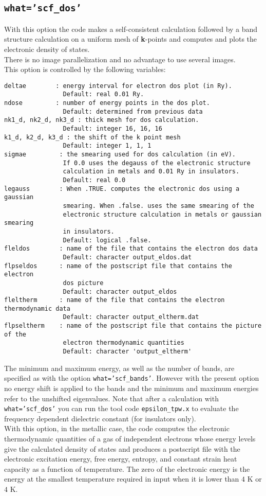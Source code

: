 \documentclass[12pt,a4paper]{article}
\begin{document}
\subsection{\color{web-blue}\texttt{what='scf\_dos'}}
With this option the code makes a self-consistent calculation followed
by a band structure calculation on a uniform mesh of {\bf k}-points and
computes and plots the electronic density of states. \\
There is no image parallelization and no advantage to use several images. \\
This option is controlled by the following variables:
\begin{verbatim} 
deltae        : energy interval for electron dos plot (in Ry).
                Default: real 0.01 Ry.
ndose         : number of energy points in the dos plot.
                Default: determined from previous data
nk1_d, nk2_d, nk3_d : thick mesh for dos calculation.
                Default: integer 16, 16, 16
k1_d, k2_d, k3_d : the shift of the k point mesh
                Default: integer 1, 1, 1
sigmae         : the smearing used for dos calculation (in eV).
                If 0.0 uses the degauss of the electronic structure
                calculation in metals and 0.01 Ry in insulators.
                Default: real 0.0 
legauss        : When .TRUE. computes the electronic dos using a gaussian
                smearing. When .false. uses the same smearing of the
                electronic structure calculation in metals or gaussian smearing
                in insulators.
                Default: logical .false.
fleldos        : name of the file that contains the electron dos data
                Default: character output_eldos.dat
flpseldos      : name of the postscript file that contains the electron 
                dos picture
                Default: character output_eldos
fleltherm      : name of the file that contains the electron thermodynamic data 
                Default: character output_eltherm.dat
flpseltherm    : name of the postscript file that contains the picture of the
                electron thermodynamic quantities
                Default: character 'output_eltherm'
\end{verbatim}
The minimum and maximum energy, as well as the number of bands,
are specified as with the option \texttt{what='scf\_bands'}.
However with the present option no energy shift is applied to the bands
and the minimum and maximum energies refer to the unshifted eigenvalues.
Note that after a calculation with \texttt{what='scf\_dos'} you can
run the tool code \texttt{epsilon\_tpw.x} to evaluate the frequency
dependent dielectric constant (for insulators only). \\
With this option, in the metallic case, 
the code computes the electronic thermodynamic quantities of
a gas of independent electrons whose energy levels give the calculated 
density of states and produces a postscript file
with the electronic excitation energy, free energy, entropy,
and constant strain heat capacity as a function of temperature. 
The zero of the electronic energy is the energy at the smallest temperature 
required in input when it is lower than $4$ K or $4$ K. \\
\end{document}
